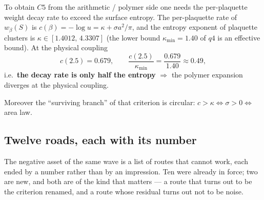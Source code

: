 To obtain $C5$ from the arithmetic / polymer side one needs the per-plaquette weight decay rate to
exceed the surface entropy. The per-plaquette rate of $w_\beta(S)$ is
$c(\beta)=-\log u=\kappa+\sigma a^{2}/\pi$, and the entropy exponent of plaquette clusters is
$\kappa\in[1.4012,\,4.3307]$ (the lower bound $\kappa_{\min}=1.40$ of $q4$ is an effective bound). At
the physical coupling
\begin{equation}
  c(2.5)=0.679,\qquad \frac{c(2.5)}{\kappa_{\min}}=\frac{0.679}{1.40}\approx0.49 ,
\end{equation}
i.e.\ \textbf{the decay rate is only half the entropy} $\Rightarrow$ the polymer expansion diverges at
the physical coupling. \LN
{}

\noindent
Moreover the ``surviving branch'' of that criterion is circular: $c>\kappa \iff \sigma>0 \iff$ area
law. \LN
{}

\subsection{Twelve roads, each with its number}
\label{sec:twelve}

The negative asset of the same wave is a list of routes that cannot work, each ended by a number
rather than by an impression. Ten were already in force; two are new, and both are of the kind that
matters --- a route that turns out to be the criterion renamed, and a route whose residual turns out
not to be noise.

